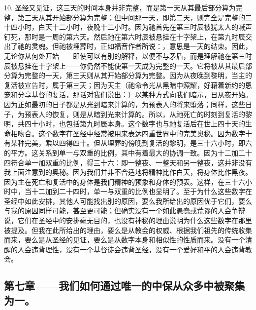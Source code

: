 10. 圣经又见证，这三天的时间本身并非完整，而是第一天从其最后部分算为完整，第三天从其开始部分算为完整；但中间那一天，即第二天，则完全是完整的二十四小时，白天十二小时，夜晚十二小时。因为祂首先在第三时辰被犹太人的喊声钉死，那时是一周的第六天。然后祂在第六时辰被悬挂在十字架上，在第九时辰交出了祂的灵魂。但祂被埋葬时，正如福音作者所说：，意思是一天的结束。因此，无论你从何处开始——即使可以有别的解释，以便不与矛盾，而是理解祂在第三时辰被悬挂在十字架上——你仍然不能使第一天成为完整的一天。它将被从其最后部分算为完整的一天，第三天则从其开始部分算为完整。因为从夜晚到黎明，当主的复活被宣告时，属于第三天；因为天主（祂命令光从黑暗中照耀，好藉着新约的恩宠和分享基督的复活，那话对我们说出：）以某种方式向我们暗示，日从夜开始。因为正如最初的日子都是从光到暗来计算的，为预表人的将来堕落；同样，这些日子，为预表人的恢复，则是从暗到光来计算的。所以，从祂死亡的时刻到复活的黎明，共四十小时，也包括第九时辰本身。这个数字也与祂复活后在世上四十天的生命相吻合。这个数字在圣经中经常被用来表达四重世界中的完美奥秘。因为数字十有某种完美，乘以四得四十。但从埋葬的傍晚到复活的黎明，是三十六小时，即六的平方。这关系到单一与双重的比例，其中有着最大的协调一致。因为十二加二十四符合单一加双重的比例，得三十六：即一整夜、一整天和另一整夜，这并非没有我上面注意到的奥秘。因为我们并非不合适地将精神比作白天，将身体比作黑夜。因为主在死亡和复活中的身体是我们精神的预象和身体的预表。这样，在三十六小时中，当十二加到二十四时，单一与双重的比例也显明了。至于为什么这些数字在圣经中如此安排，其他人可能找出别的原因，要么我所给出的原因优于它们，要么与我的原因同样可能，甚至更可能；但确实没有一个如此愚蠢或荒谬的人会争辩说，它们在圣经中的安排毫无目的，也没有神秘的理由说明为什么这些数字在那里被提及。但我在此所给出的理由，要么是从教会的权威、根据我们祖先的传统收集而来，要么是从圣经的见证，要么是从数字本身和相似性的性质而来。没有一个清醒的人会违背理性，没有一个基督徒会违背圣经，没有一个爱好和平的人会违背教会。\par


\subsection{第七章——我们如何通过唯一的中保从众多中被聚集为一。}

